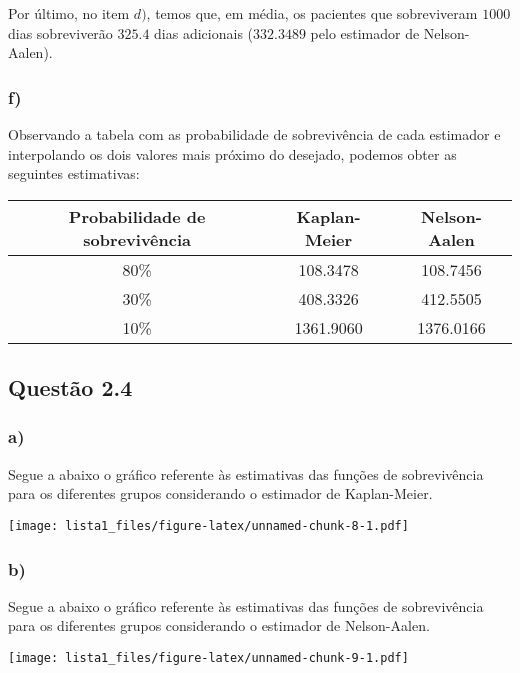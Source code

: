 \documentclass[
]{article}
\begin{document}
Por último, no item \(d)\), temos que, em média, os pacientes que
sobreviveram \(1000\) dias sobreviverão \(325.4\) dias adicionais
(\(332.3489\) pelo estimador de Nelson-Aalen).

\hypertarget{f}{%
\subsubsection{f)}\label{f}}

Observando a tabela com as probabilidade de sobrevivência de cada
estimador e interpolando os dois valores mais próximo do desejado,
podemos obter as seguintes estimativas:

\begin{table}[H]
\centering
\begin{tabular}{ccc}
\toprule
Probabilidade de sobrevivência & Kaplan-Meier & Nelson-Aalen\\
\midrule
80\% & 108.3478 & 108.7456\\
30\% & 408.3326 & 412.5505\\
10\% & 1361.9060 & 1376.0166\\
\bottomrule
\end{tabular}
\end{table}

\hypertarget{questuxe3o-2.4}{%
\subsection{Questão 2.4}\label{questuxe3o-2.4}}

\hypertarget{a-1}{%
\subsubsection{a)}\label{a-1}}

Segue a abaixo o gráfico referente às estimativas das funções de
sobrevivência para os diferentes grupos considerando o estimador de
Kaplan-Meier.

\texttt{[image: lista1\_files/figure-latex/unnamed-chunk-8-1.pdf]}

\hypertarget{b-1}{%
\subsubsection{b)}\label{b-1}}

Segue a abaixo o gráfico referente às estimativas das funções de
sobrevivência para os diferentes grupos considerando o estimador de
Nelson-Aalen.

\texttt{[image: lista1\_files/figure-latex/unnamed-chunk-9-1.pdf]}
\end{document}
